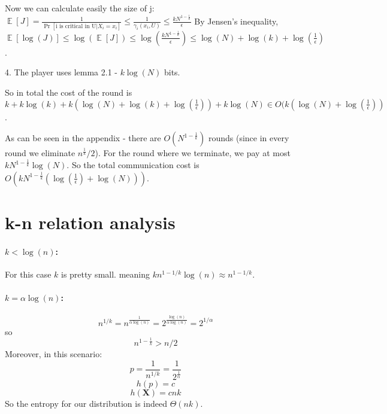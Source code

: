 \documentclass{article}
\newcommand{\rv}[1]{\mathbf{#1}}
\theoremstyle{plain}
\begin{document}
Now we can calculate easily the size of j: \newline
$ \mathop{\mathbb{E}} [J] = \frac{1}{\Pr[\text{i is critical in U}| X_i = x_i]} \leq \frac{1}{\gamma_i(x_i, U)} \leq \frac{kN^{1-\frac{1}{k}}}{\epsilon}$ \newline
By Jensen's inequality, $\mathop{\mathbb{E}} [\log(J)] \leq \log(\mathop{\mathbb{E}} [J]) \leq \log(\frac{kN^{1-\frac{1}{k}}}{\epsilon}) \leq \log(N) + \log(k) + \log(\frac{1}{\epsilon})$.  \newline

4. The player uses lemma 2.1 - $k\log(N)$ bits.

So in total the cost of the round is $k + k\log(k) + k(\log(N) + \log(k) + \log(\frac{1}{\epsilon})) + k\log(N) \in O(k(\log(N) + \log(\frac{1}{\epsilon}))$.

As can be seen in the appendix - there are $O(N^{1-\frac{1}{k}})$ rounds (since in every round we eliminate $n^{\frac{1}{k}}/2$). \newline
For the round where we terminate, we pay at most $kN^{1-\frac{1}{k}} \log(N)$. \newline
So the total communication cost is  $O(kN^{1-\frac{1}{k}}(\log(\frac{1}{\epsilon}) + \log(N)))$.
\section{k-n relation analysis}
\paragraph{$k < \log(n)$:}
For this case $k$ is pretty small. meaning $kn^{1-1/k}\log(n) \approx n^{1-1/k}$. 
\paragraph{$k = \alpha\log(n)$:}
\begin{equation*}
    n^{1/k} = n^{\frac{1}{\alpha\log(n)}} = 2^{\frac{\log(n)}{\alpha\log(n)}} = 2^{1/\alpha}
\end{equation*}
so
\begin{equation*}
    n^{1-\frac{1}{k}} > n/2
\end{equation*}
Moreover, in this scenario:
\begin{equation*}
    p = \frac{1}{n^{1/k}} = \frac{1}{2^{\frac{1}{\alpha}}} 
\end{equation*}
\begin{equation*}
    h(p) = c 
\end{equation*}
\begin{equation*}
    h(\rv{X}) = cnk
\end{equation*}
So the entropy for our distribution is indeed $\Theta(nk)$.
\end{document}
